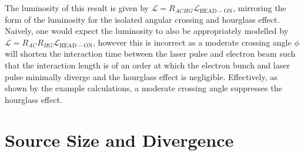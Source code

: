 \documentclass[../main.tex]{subfiles}
\begin{document}
The luminosity of this result is given by $\mathcal{L} = R_{ACHG}\mathcal{L}_{\mathrm{HEAD-ON}}$, mirroring the form of the luminosity for the isolated angular crossing and hourglass effect. Naively, one would expect the luminosity to also be appropriately modelled by $\mathcal{L} = R_{AC}R_{HG}\mathcal{L}_{\mathrm{HEAD-ON}}$, however this is incorrect as a moderate crossing angle $\phi$ will shorten the interaction time between the laser pulse and electron beam such that the interaction length is of an order at which the electron bunch and laser pulse minimally diverge and the hourglass effect is negligible. Effectively, as shown by the example calculations, a moderate crossing angle suppresses the hourglass effect.   

\section{Source Size and Divergence}
\label{sec:source_size_divergence}
\end{document}
